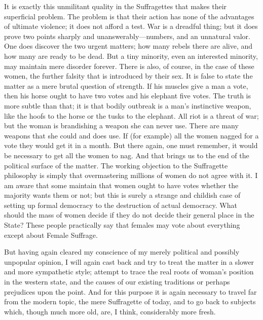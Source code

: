 \documentclass{book}
\begin{document}
It is exactly this unmilitant quality in the Suffragettes that makes their superficial problem. The problem is that their action has none of the advantages of ultimate violence; it does not afford a test. War is a dreadful thing; but it does prove two points sharply and unanswerably—numbers, and an unnatural valor. One does discover the two urgent matters; how many rebels there are alive, and how many are ready to be dead. But a tiny minority, even an interested minority, may maintain mere disorder forever. There is also, of course, in the case of these women, the further falsity that is introduced by their sex. It is false to state the matter as a mere brutal question of strength. If his muscles give a man a vote, then his horse ought to have two votes and his elephant five votes. The truth is more subtle than that; it is that bodily outbreak is a man’s instinctive weapon, like the hoofs to the horse or the tusks to the elephant. All riot is a threat of war; but the woman is brandishing a weapon she can never use. There are many weapons that she could and does use. If (for example) all the women nagged for a vote they would get it in a month. But there again, one must remember, it would be necessary to get all the women to nag. And that brings us to the end of the political surface of the matter. The working objection to the Suffragette philosophy is simply that overmastering millions of women do not agree with it. I am aware that some maintain that women ought to have votes whether the majority wants them or not; but this is surely a strange and childish case of setting up formal democracy to the destruction of actual democracy. What should the mass of women decide if they do not decide their general place in the State? These people practically say that females may vote about everything except about Female Suffrage.

But having again cleared my conscience of my merely political and possibly unpopular opinion, I will again cast back and try to treat the matter in a slower and more sympathetic style; attempt to trace the real roots of woman’s position in the western state, and the causes of our existing traditions or perhaps prejudices upon the point. And for this purpose it is again necessary to travel far from the modern topic, the mere Suffragette of today, and to go back to subjects which, though much more old, are, I think, considerably more fresh.
\end{document}
